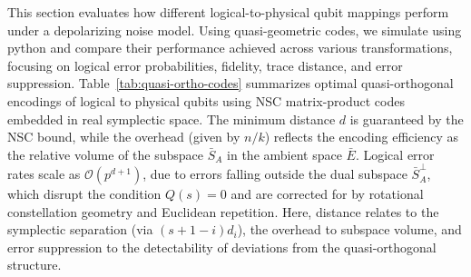 \documentclass{iopjournal}
\theoremstyle{thmstyleone}%
\theoremstyle{thmstyletwo}%
\theoremstyle{thmstylethree}%
\begin{document}
This section evaluates how different logical-to-physical qubit mappings perform under a depolarizing noise model. Using quasi-geometric codes, we simulate using python and compare their performance achieved across various transformations, focusing on logical error probabilities, fidelity, trace distance, and error suppression. 
Table~\ref{tab:quasi-ortho-codes} summarizes optimal quasi-orthogonal encodings of logical to physical qubits using NSC matrix-product codes embedded in real symplectic space. The minimum distance $d$ is guaranteed by the NSC bound, while the overhead (given by $n/k$) reflects the encoding efficiency as the relative volume of the subspace $\bar{S}_A$ in the ambient space $\bar{E}$. Logical error rates scale as $\mathcal{O}(p^{d+1})$, due to errors falling outside the dual subspace $\bar{S}_A^\perp$, which disrupt the condition $Q(s) = 0$ and are corrected for by rotational constellation geometry and Euclidean repetition. Here, distance relates to the  symplectic separation (via $(s+1-i)d_i$), the overhead to subspace volume, and error suppression to the detectability of deviations from the quasi-orthogonal structure.


\begin{table}[!ht]
\centering
\caption{Quasi-orthogonal geometric mapping of logical qubits to physical qubits via totally singular subspaces $\bar{S}_A$. The overhead is $n/k$, minimum weight follows from  NSC bound, and logical error rate scales as $\mathcal{O}(p^{d+1})$ due to distance-$d$ error suppression.}
\label{tab:quasi-ortho-codes}

\end{table}
\end{document}
